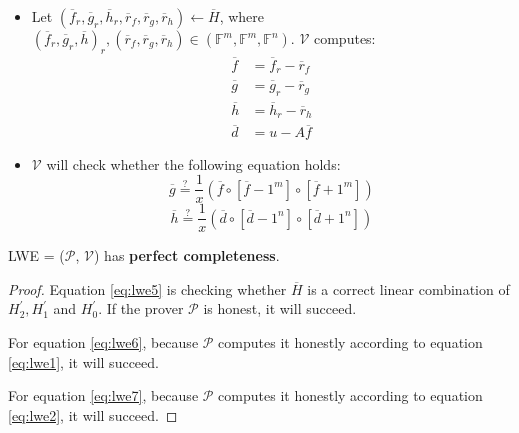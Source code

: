 \begin{itemize}
    \item Let $(\overline{f}_r, \overline{g}_r, \overline{h}_r, \overline{r}_f, \overline{r}_g, \overline{r}_h) \leftarrow \overline{H}$, where $(\overline{f}_r, \overline{g}_r, \overline{h})_r, (\overline{r}_f, \overline{r}_g, \overline{r}_h) \in (\mathbb{F}^m, \mathbb{F}^m, \mathbb{F}^n)$. 
    $\mathcal{V}$ computes:
\begin{align*}
    \overline{f} &= \overline{f}_r - \overline{r}_f \\
    \overline{g} &= \overline{g}_r - \overline{r}_g \\
    \overline{h} &= \overline{h}_r - \overline{r}_h \\
    \overline{d} &= u - A\overline{f}
\end{align*}

    \item $\mathcal{V}$ will check whether the following equation holds:
\begin{equation}
\label{eq:lwe6}
    \overline{g} \overset{?}{=} \frac{1}{x} (\overline{f} \circ [\overline{f} - 1^m] \circ [\overline{f} + 1^m])
\end{equation}
\begin{equation}
\label{eq:lwe7}
    \overline{h} \overset{?}{=} \frac{1}{x} (\overline{d} \circ [\overline{d} - 1^n] \circ [\overline{d} + 1^n])
\end{equation}
    

\end{itemize}

\begin{lemma}
\label{lemma:lwepc}

LWE = ($\mathcal{P}$, $\mathcal{V}$) has \textbf{perfect completeness}.

\end{lemma}
\begin{proof}

Equation \ref{eq:lwe5} is checking whether $\overline{H}$ is a correct linear combination of $H_2^\prime, H_1^\prime$ and $H_0^\prime$. If the prover $\mathcal{P}$ is honest, it will succeed.


For equation \ref{eq:lwe6}, because $\mathcal{P}$ computes it honestly according to equation \ref{eq:lwe1}, it will succeed.

For equation \ref{eq:lwe7}, because $\mathcal{P}$ computes it honestly according to equation \ref{eq:lwe2}, it will succeed.

\end{proof}

